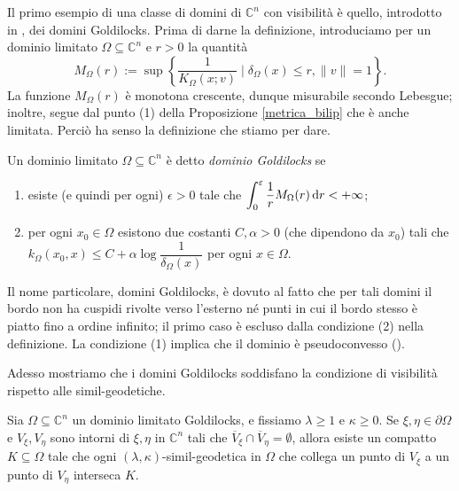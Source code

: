 Il primo esempio di una classe di domini di $\mathbb{C}^n$ con visibilità è quello, introdotto in \cite{BZ1}, dei domini Goldilocks. Prima di darne la definizione, introduciamo per un dominio limitato $\Omega\subseteq\mathbb{C}^n$ e $r>0$ la quantità
$$M_\Omega(r):=\sup\left\{\frac{1}{K_\Omega(x;v)}\mid \delta_\Omega(x) \le r, \|v\|=1\right\}.$$
La funzione $M_\Omega(r)$ è monotona crescente, dunque misurabile secondo Lebesgue; inoltre, segue dal punto (1) della Proposizione \ref{metrica_bilip} che è anche limitata. Perciò ha senso la definizione che stiamo per dare.

\begin{defn}
    Un dominio limitato $\Omega\subseteq\mathbb{C}^n$ è detto \textit{dominio Goldilocks} se
    \begin{enumerate}[label={(\arabic*)}]
        \item esiste (e quindi per ogni) $\epsilon>0$ tale che $\displaystyle\int_0^{\varepsilon} \frac{1}{r}M_\Omega(r)\mathop{}\!\mathrm{d} r<+\infty$;
        \item per ogni $x_0\in\Omega$ esistono due costanti $C,\alpha>0$ (che dipendono da $x_0$) tali che $k_\Omega(x_0,x) \le C+\alpha\log{\dfrac{1}{\delta_\Omega(x)}}$ per ogni $x\in\Omega$.
    \end{enumerate}
\end{defn}

Il nome particolare, domini Goldilocks, è dovuto al fatto che per tali domini il bordo non ha cuspidi rivolte verso l'esterno né punti in cui il bordo stesso è piatto fino a ordine infinito; il primo caso è escluso dalla condizione (2) nella definizione. La condizione (1) implica che il dominio è pseudoconvesso (\cite[Section 2, Paragraph 2.4]{BZ1}).

Adesso mostriamo che i domini Goldilocks soddisfano la condizione di visibilità rispetto alle simil-geodetiche.

\begin{thm}
    Sia $\Omega\subseteq\mathbb{C}^n$ un dominio limitato Goldilocks, e fissiamo $\lambda\ge 1$ e $\kappa\ge 0$. Se $\xi,\eta\in\partial\Omega$ e $V_\xi,V_\eta$ sono intorni di $\xi,\eta$ in $\mathbb{C}^n$ tali che $\overline{V}_\xi\cap\overline{V}_\eta=\emptyset$, allora esiste un compatto $K\subseteq\Omega$ tale che ogni $(\lambda,\kappa)$-simil-geodetica in $\Omega$ che collega un punto di $V_\xi$ a un punto di $V_\eta$ interseca $K$.
\end{thm}

